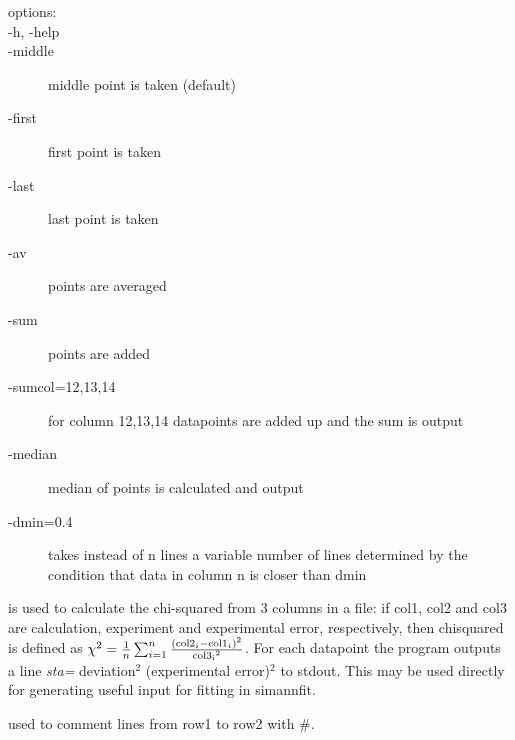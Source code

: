 \begin{description}
\begin{description}
 \item [options:]
  \item[-h, -help]
  \item       [-middle]       middle point is taken (default)
  \item       [-first]       first point is taken 
   \item      [-last]        last point is taken 
   \item      [-av]           points are averaged
   \item      [-sum]           points are added
    \item     [-sumcol=12,13,14]  for column 12,13,14 datapoints are added up and the sum is output
    \item     [-median]       median of points is calculated and output
     \item    [-dmin=0.4]    takes instead of n lines a variable number
                         of lines determined by the condition that
                         data in column n is closer than dmin 
\end{description}       
\item [\prg chi2\index{chi2}\label{chi2} col1 col2 col3 *.*] is used to calculate the 
 chi-squared from 3 columns in a file: if col1, col2 and col3 are calculation, 
 experiment and experimental error, respectively, then
  chisquared is defined as $\chi^2=\frac{1}{n}\sum_{i=1}^n \frac{({\rm col2}_i-{\rm %
col1}_i)^2}{{\rm col3_i}^2}$. For each datapoint the program outputs a line
{\em sta=} deviation$^2$  (experimental error)$^2$ to stdout. This may be 
used directly for generating useful input for fitting in {\prg simannfit}.
\item [\prg comment\index{comment}\label{comment} row1 row2 *.*]
 used to comment lines from row1 to row2 with \#.
 

\end{description}
